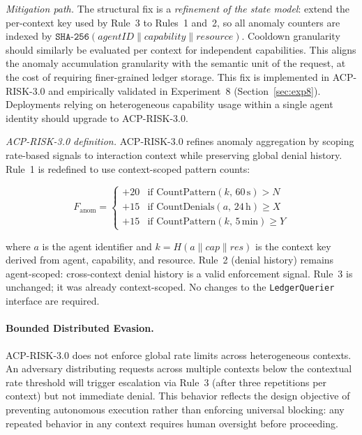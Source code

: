 \documentclass[11pt]{article}
\theoremstyle{definition}
\begin{document}
\emph{Mitigation path.}
The structural fix is a \emph{refinement of the state model}:
extend the per-context key used by Rule~3 to Rules~1 and~2,
so all anomaly counters are indexed by
$\texttt{SHA-256}(\textit{agentID} \parallel \textit{capability} \parallel \textit{resource})$.
Cooldown granularity should similarly be evaluated per context for independent capabilities.
This aligns the anomaly accumulation granularity with the semantic unit of the request,
at the cost of requiring finer-grained ledger storage.
This fix is implemented in ACP-RISK-3.0 and empirically validated in Experiment~8
(Section~\ref{sec:exp8}).
Deployments relying on heterogeneous capability usage within a single agent identity
should upgrade to ACP-RISK-3.0.

\emph{ACP-RISK-3.0 definition.}
ACP-RISK-3.0 refines anomaly aggregation by scoping rate-based signals to
interaction context while preserving global denial history. Rule~1 is redefined
to use context-scoped pattern counts:

\begin{equation}
F_{\text{anom}} =
\begin{cases}
+20 & \text{if } \mathrm{CountPattern}(k,\,60\,\text{s}) > N \\
+15 & \text{if } \mathrm{CountDenials}(a,\,24\,\text{h}) \geq X \\
+15 & \text{if } \mathrm{CountPattern}(k,\,5\,\text{min}) \geq Y
\end{cases}
\label{eq:fanom-30}
\end{equation}

where $a$ is the agent identifier and $k = H(a \parallel \mathit{cap} \parallel
\mathit{res})$ is the context key derived from agent, capability, and resource.
Rule~2 (denial history) remains agent-scoped: cross-context denial history is a
valid enforcement signal. Rule~3 is unchanged; it was already context-scoped.
No changes to the \texttt{LedgerQuerier} interface are required.

\paragraph{Bounded Distributed Evasion.}
ACP-RISK-3.0 does not enforce global rate limits across heterogeneous
contexts. An adversary distributing requests across multiple contexts
below the contextual rate threshold will trigger escalation via Rule~3
(after three repetitions per context) but not immediate denial. This
behavior reflects the design objective of preventing autonomous execution
rather than enforcing universal blocking: any repeated behavior in any
context requires human oversight before proceeding.
\end{document}
